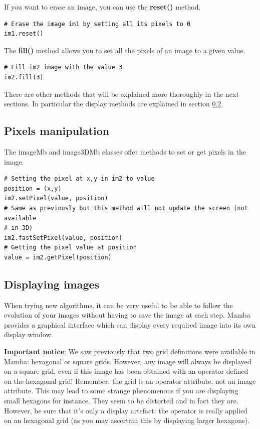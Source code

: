 \documentclass[a4paper,10pt,oneside]{article}
\begin{document}
If you want to erase an image, you can use the \textbf{reset()} method. 

\lstset{language=Python}
\begin{lstlisting}
# Erase the image im1 by setting all its pixels to 0
im1.reset()
\end{lstlisting}

The \textbf{fill()} method allows you to set all the pixels of an image to a given value.

\lstset{language=Python}
\begin{lstlisting}
# Fill im2 image with the value 3
im2.fill(3)
\end{lstlisting}

There are other methods that will be explained more thoroughly in the next
sections. In particular the display methods are explained in section 
\ref{cha:disp_im}.

\subsection{Pixels manipulation}

The imageMb and image3DMb classes offer methods to set or get pixels
in the image.

\lstset{language=Python}
\begin{lstlisting}
# Setting the pixel at x,y in im2 to value
position = (x,y)
im2.setPixel(value, position)
# Same as previously but this method will not update the screen (not available
# in 3D)
im2.fastSetPixel(value, position)
# Getting the pixel value at position
value = im2.getPixel(position)
\end{lstlisting}

\subsection{Displaying images}
\label{cha:disp_im}

When trying new algorithms, it can be very useful to be able to follow the 
evolution of your images without having to save the image at each step. Mamba
provides a graphical interface which can display every required image into
its own display window.

\textbf{Important notice}: We saw previously that two grid definitions were 
available in Mamba: hexagonal or square grids. However, any image will always be 
displayed on a square grid, even if this image has been obtained with an operator 
defined on the hexagonal grid! Remember: the grid is an operator attribute, not an 
image attribute. This may lead to some strange phenomenons if you are displaying 
small hexagons for instance. They seem to be distorted and in fact they are. However, 
be sure that it's only a display artefact: the operator is really applied on an hexagonal 
grid (as you may ascertain this by displaying larger hexagons).
\end{document}
